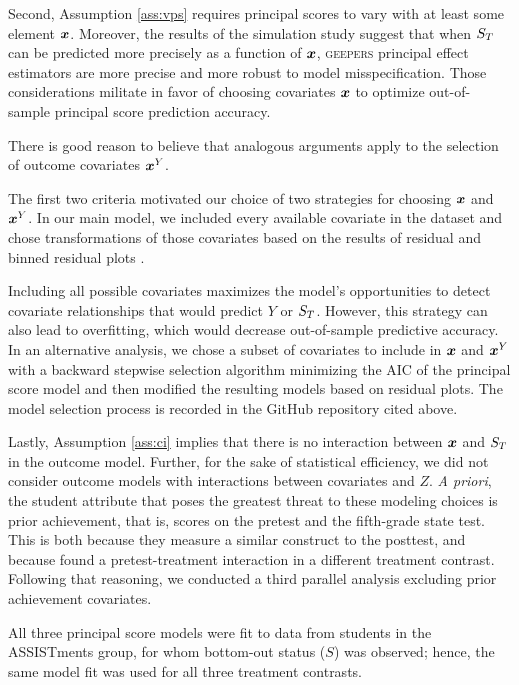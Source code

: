 \documentclass[]{article}
\begin{document}
Second, Assumption \ref{ass:vps} requires principal scores to vary with at least some element $\bm{x}$. Moreover, the results of the simulation study suggest that when $S_T$ can be predicted more precisely as a function of $\bm{x}$, \textsc{geepers} principal effect estimators are more precise and more robust to model misspecification.
Those considerations militate in favor of choosing covariates $\bm{x}$ to optimize out-of-sample principal score prediction accuracy.

There is good reason to believe that analogous arguments apply to the selection of outcome covariates $\bm{x}^Y$.

The first two criteria motivated our choice of two strategies for choosing $\bm{x}$ and $\bm{x}^Y$.
In our main model, we included every available covariate in the dataset and chose transformations of those covariates based on the results of residual and binned residual plots \citep{arm}.

Including all possible covariates maximizes the model's opportunities to detect covariate relationships that would predict $Y$ or $S_T$.
However, this strategy can also lead to overfitting, which would decrease out-of-sample predictive accuracy.
In an alternative analysis, we chose a subset of covariates to include in $\bm{x}$ and $\bm{x}^Y$ with a backward stepwise selection algorithm minimizing the AIC \citep{aic} of the principal score model and then modified the resulting models based on residual plots.
The model selection process is recorded in the GitHub repository cited above.

Lastly, Assumption \ref{ass:ci} implies that there is no interaction between $\bm{x}$ and $S_T$ in the outcome model. Further, for the sake of statistical efficiency, we did not consider outcome models with interactions between covariates and $Z$.
\emph{A priori}, the student attribute that poses the greatest threat to these modeling choices is prior achievement, that is, scores on the pretest and the fifth-grade state test.
This is both because they measure a similar construct to the posttest, and because \cite{impactPaper} found a pretest-treatment interaction in a different treatment contrast.
Following that reasoning, we conducted a third parallel analysis excluding prior achievement covariates.%

All three principal score models were fit to data from students in the ASSISTments group, for whom bottom-out status ($S$) was observed; hence, the same model fit was used for all three treatment contrasts.
\end{document}
